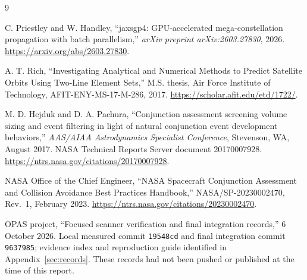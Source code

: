\documentclass[11pt,a4paper]{article}
\begin{document}
\begin{thebibliography}{9}

C. Priestley and W. Handley,
``jaxsgp4: GPU-accelerated mega-constellation propagation with batch parallelism,''
\emph{arXiv preprint arXiv:2603.27830}, 2026.
\url{https://arxiv.org/abs/2603.27830}.

A. T. Rich,
``Investigating Analytical and Numerical Methods to Predict Satellite Orbits Using Two-Line Element Sets,''
M.S. thesis, Air Force Institute of Technology, AFIT-ENY-MS-17-M-286, 2017.
\url{https://scholar.afit.edu/etd/1722/}.

M. D. Hejduk and D. A. Pachura,
``Conjunction assessment screening volume sizing and event filtering in light of natural conjunction event development behaviors,''
\emph{AAS/AIAA Astrodynamics Specialist Conference}, Stevenson, WA,
August 2017. NASA Technical Reports Server document 20170007928.
\url{https://ntrs.nasa.gov/citations/20170007928}.

NASA Office of the Chief Engineer,
``NASA Spacecraft Conjunction Assessment and Collision Avoidance Best Practices Handbook,''
NASA/SP-20230002470, Rev.~1, February 2023.
\url{https://ntrs.nasa.gov/citations/20230002470}.

OPAS project,
``Focused scanner verification and final integration records,''
6 October 2026. Local measured commit \texttt{19548cd} and final integration
commit \texttt{9637985}; evidence index and reproduction guide identified
in Appendix~\ref{sec:records}. These records had not been pushed or published
at the time of this report.

\end{thebibliography}
\end{document}

